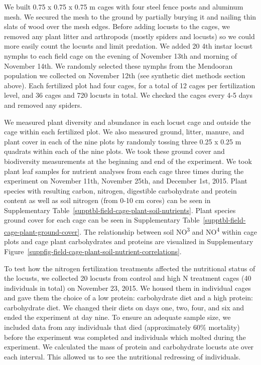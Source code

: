 \documentclass[
]{article}
\begin{document}
We built 0.75 x 0.75 x 0.75 m cages with four steel fence posts and
aluminum mesh. We secured the mesh to the ground by partially burying it
and nailing thin slats of wood over the mesh edges. Before adding
locusts to the cages, we removed any plant litter and arthropods (mostly
spiders and locusts) so we could more easily count the locusts and limit
predation. We added 20 4th instar locust nymphs to each field cage on
the evening of November 13th and morning of November 14th. We randomly
selected these nymphs from the Mendooran population we collected on
November 12th (see synthetic diet methods section above). Each
fertilized plot had four cages, for a total of 12 cages per
fertilization level, and 36 cages and 720 locusts in total. We checked
the cages every 4-5 days and removed any spiders.

We measured plant diversity and abundance in each locust cage and
outside the cage within each fertilized plot. We also measured ground,
litter, manure, and plant cover in each of the nine plots by randomly
tossing three 0.25 x 0.25 m quadrats within each of the nine plots. We
took these ground cover and biodiversity measurements at the beginning
and end of the experiment. We took plant leaf samples for nutrient
analyses from each cage three times during the experiment on November
11th, November 25th, and December 1st, 2015. Plant species with
resulting carbon, nitrogen, digestible carbohydrate and protein content
as well as soil nitrogen (from 0-10 cm cores) can be seen in
Supplementary Table~\ref{supptbl-field-cage-plant-soil-nutrients}. Plant
species ground cover for each cage can be seen in
Supplementary Table~\ref{supptbl-field-cage-plant-ground-cover}. The
relationship between soil NO\textsuperscript{3} and
NO\textsuperscript{4} within cage plots and cage plant carbohydrates and
proteins are visualized in
Supplementary Figure~\ref{suppfig-field-cage-plant-soil-nutrient-correlations}.

To test how the nitrogen fertilization treatments affected the
nutritional status of the locusts, we collected 20 locusts from control
and high N treatment cages (40 individuals in total) on November 23,
2015. We housed them in individual cages and gave them the choice of a
low protein: carbohydrate diet and a high protein: carbohydrate diet. We
changed their diets on days one, two, four, and six and ended the
experiment at day nine. To ensure an adequate sample size, we included
data from any individuals that died (approximately 60\% mortality)
before the experiment was completed and individuals which molted during
the experiment. We calculated the mass of protein and carbohydrate
locusts ate over each interval. This allowed us to see the nutritional
redressing of individuals.
\end{document}
